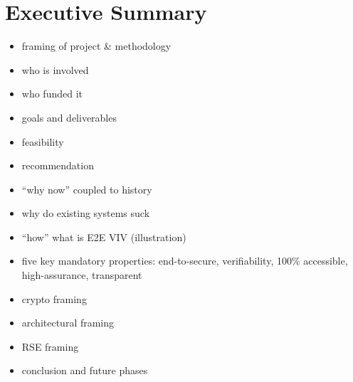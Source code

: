 \chapter{Executive Summary}
\label{chapter:executive_summary}

\begin{itemize}
\item framing of project \& methodology
\item who is involved
\item who funded it
\item goals and deliverables
\item feasibility
\item recommendation
\item ``why now'' coupled to history
\item why do existing systems suck
\item ``how'' what is E2E VIV (illustration)
\item five key mandatory properties: end-to-secure, verifiability,
  100\% accessible, high-assurance, transparent
\item crypto framing
\item architectural framing
\item RSE framing
\item conclusion and future phases
\end{itemize}
